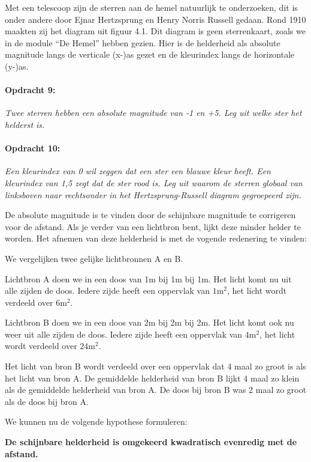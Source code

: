 Met een telescoop zijn de sterren aan de hemel natuurlijk te onderzoeken,
dit is onder andere door Ejnar Hertzsprung en Henry Norris Russell
gedaan. Rond 1910 maakten zij het diagram uit figuur 4.1. Dit diagram
is geen sterrenkaart, zoals we in de module ``De Hemel'' hebben
gezien. Hier is de helderheid als absolute magnitude langs de verticale
(x-)as gezet en de kleurindex langs de horizontale (y-)as.


\paragraph*{Opdracht 9:}

\emph{Twee sterren hebben een absolute magnitude van -1 en +5. Leg
uit welke ster het helderst is.}


\paragraph*{Opdracht 10:}

\emph{Een kleurindex van 0 wil zeggen dat een ster een blauwe kleur
heeft. Een kleurindex van 1,5 zegt dat de ster rood is. Leg uit waarom
de sterren globaal van linksboven naar rechtsonder in het Hertzsprung-Russell
diagram gegroepeerd zijn. }

De absolute magnitude is te vinden door de schijnbare magnitude te
corrigeren voor de afstand. Als je verder van een lichtbron bent,
lijkt deze minder helder te worden. Het afnemen van deze helderheid
is met de vogende redenering te vinden:

We vergelijken twee gelijke lichtbronnen A en B.

Lichtbron A doen we in een doos van 1m bij 1m bij 1m. Het licht komt
nu uit alle zijden de doos. Iedere zijde heeft een oppervlak van $1\mathrm{m}^{2}$,
het licht wordt verdeeld over $6\mathrm{m}^{2}$.

Lichtbron B doen we in een doos van 2m bij 2m bij 2m. Het licht komt
ook nu weer uit alle zijden de doos. Iedere zijde heeft een oppervlak
van $4\mathrm{m}^{2}$, het licht wordt verdeeld over $24\mathrm{m}^{2}$.

Het licht van bron B wordt verdeeld over een oppervlak dat 4 maal
zo groot is als het licht van bron A. De gemiddelde helderheid van
bron B lijkt 4 maal zo klein als de gemiddelde helderheid van bron
A. De doos bij bron B was 2 maal zo groot als de doos bij bron A.

We kunnen nu de volgende hypothese formuleren:

\textbf{De schijnbare helderheid is omgekeerd kwadratisch evenredig
met de afstand.}

